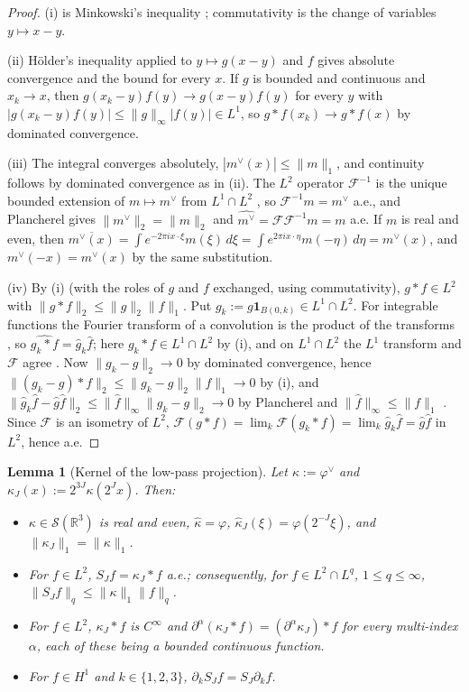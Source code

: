 \documentclass[11pt]{article}
\newtheorem{lemma}[theorem]{Lemma}
\theoremstyle{definition}
\theoremstyle{plain}
\newcommand{\R}{\mathbb R}
\newcommand{\norm}[1]{\lVert #1\rVert}
\begin{document}
\begin{proof}
(i) is Minkowski's inequality \cite[Thm.~1.2.10]{Grafakos2014};
commutativity is the change of variables $y\mapsto x-y$.

(ii) H\"older's inequality applied to $y\mapsto g(x-y)$ and $f$ gives
absolute convergence and the bound for every $x$.  If $g$ is bounded and
continuous and $x_k\to x$, then $g(x_k-y)f(y)\to g(x-y)f(y)$ for every $y$
with $|g(x_k-y)f(y)|\le\norm g_\infty|f(y)|\in L^1$, so $g*f(x_k)\to g*f(x)$
by dominated convergence.

(iii) The integral converges absolutely, $|m^\vee(x)|\le\norm m_1$, and
continuity follows by dominated convergence as in (ii).  The
$L^2$ operator $\mathcal F^{-1}$ is the unique bounded extension of
$m\mapsto m^\vee$ from $L^1\cap L^2$ \cite[pp.~113--114]{Grafakos2014}, so
$\mathcal F^{-1}m=m^\vee$ a.e., and Plancherel gives
$\norm{m^\vee}_2=\norm m_2$ and $\widehat{m^\vee}=\mathcal F\mathcal F^{-1}m=m$ a.e.
If $m$ is real and even, then
$\overline{m^\vee(x)}=\int e^{-2\pi ix\cdot\xi}m(\xi)\,d\xi
=\int e^{2\pi ix\cdot\eta}m(-\eta)\,d\eta=m^\vee(x)$, and
$m^\vee(-x)=m^\vee(x)$ by the same substitution.

(iv) By (i) (with the roles of $g$ and $f$ exchanged, using commutativity),
$g*f\in L^2$ with $\norm{g*f}_2\le\norm g_2\norm f_1$.  Put
$g_k:=g\mathbf 1_{B(0,k)}\in L^1\cap L^2$.  For integrable functions the
Fourier transform of a convolution is the product of the transforms
\cite[Prop.~2.2.11(12) and p.~113]{Grafakos2014}, so
$\widehat{g_k*f}=\hat g_k\hat f$; here $g_k*f\in L^1\cap L^2$ by (i), and on
$L^1\cap L^2$ the $L^1$ transform and $\mathcal F$ agree
\cite[p.~114]{Grafakos2014}.  Now $\norm{g_k-g}_2\to0$ by dominated
convergence, hence $\norm{(g_k-g)*f}_2\le\norm{g_k-g}_2\norm f_1\to0$ by (i),
and $\norm{\hat g_k\hat f-\hat g\hat f}_2\le\norm{\hat f}_\infty\norm{g_k-g}_2\to0$
by Plancherel and $\norm{\hat f}_\infty\le\norm f_1$
\cite[Prop.~2.2.11(1)]{Grafakos2014}.  Since $\mathcal F$ is an isometry of
$L^2$, $\mathcal F(g*f)=\lim_k\mathcal F(g_k*f)=\lim_k\hat g_k\hat f=\hat g\hat f$
in $L^2$, hence a.e.
\end{proof}

\begin{lemma}[Kernel of the low-pass projection]\label{lem:lowpass-kernel}
Let $\kappa:=\varphi^\vee$ and $\kappa_J(x):=2^{3J}\kappa(2^Jx)$.  Then:
\begin{itemize}
\item[(a)] $\kappa\in\mathcal S(\R^3)$ is real and even, $\hat\kappa=\varphi$,
$\hat\kappa_J(\xi)=\varphi(2^{-J}\xi)$, and $\norm{\kappa_J}_1=\norm\kappa_1$.
\item[(b)] For $f\in L^2$, $S_Jf=\kappa_J*f$ a.e.; consequently, for
$f\in L^2\cap L^q$, $1\le q\le\infty$, $\norm{S_Jf}_q\le\norm\kappa_1\norm f_q$.
\item[(c)] For $f\in L^2$, $\kappa_J*f$ is $C^\infty$ and
$\partial^\alpha(\kappa_J*f)=(\partial^\alpha\kappa_J)*f$ for every
multi-index $\alpha$, each of these being a bounded continuous function.
\item[(d)] For $f\in H^1$ and $k\in\{1,2,3\}$, $\partial_kS_Jf=S_J\partial_kf$.
\end{itemize}
\end{lemma}
\end{document}
